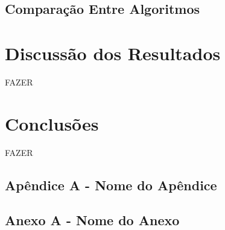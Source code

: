 \documentclass[
	12pt,				%
	oneside,   	        %
	a4paper,			%
	english,			%
	french,				%
	spanish,			%
	brazil,				%
	]{pacotes/abntex2}
\begin{document}
\subsection{Comparação Entre Algoritmos}
\label{subsec:algoritmos}


\section{Discussão dos Resultados}
\label{sec:discussao}

FAZER

\section{Conclusões}
\label{sec:conclusoes}

FAZER

\postextual
\renewcommand{\bibsection}{%
\section{\bibname}
\bibmark
\prebibhook}






\begin{apendicesenv}

\section*{Apêndice A - Nome do Apêndice}

\end{apendicesenv}



\begin{anexosenv}

\section*{Anexo A - Nome do Anexo}
\end{anexosenv}
\end{document}
